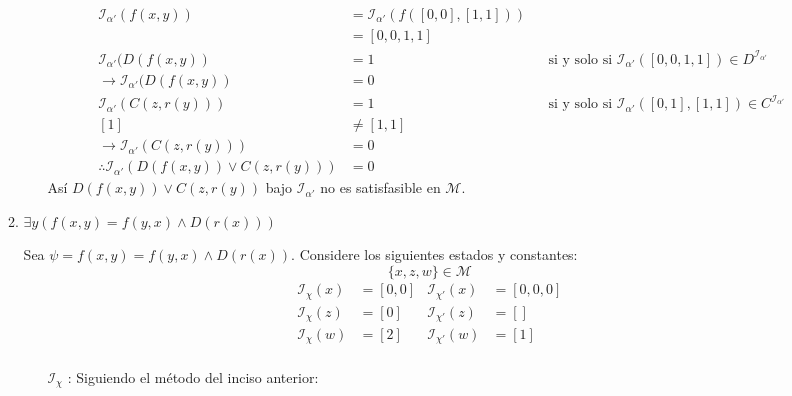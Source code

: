 \documentclass[8pt, letterpaper]{article}
\begin{document}
\begin{enumerate}
\begin{enumerate}
\begin{itemize}
\begin{align*}
        \mathcal{I}_{\alpha'}(f(x,y)) &= \mathcal{I}_{\alpha'}(f([0,0],[1, 1]))\\
        &= [0, 0, 1, 1]\\
        \mathcal{I}_{\alpha'}(D(f(x,y)) &= 1 & &\text{si y solo si }\mathcal{I}_{\alpha'}([0, 0, 1, 1])\in D^\mathcal{I_{\alpha'}}\\
        \rightarrow \mathcal{I}_{\alpha'}(D(f(x,y)) &= 0 \\
        \mathcal{I}_{\alpha'}(C(z, r(y))) &= 1 & &\text{si y solo si }\mathcal{I}_{\alpha'}([0,1],[1,1])\in C^\mathcal{I_{\alpha'}}\\
        [1] &\neq [1,1]\\
        \rightarrow \mathcal{I}_{\alpha'}(C(z, r(y))) &= 0\\
        \therefore \mathcal{I}_{\alpha'}(D(f(x,y)) \lor C(z, r(y))) &= 0
      \end{align*}
      Así $D(f(x,y)) \lor C(z, r(y))$ bajo $\mathcal{I}_{\alpha'}$ no es satisfasible en $\mathcal{M}$.
    \end{itemize}
  \item $\exists y(f(x,y) = f(y,x)\land D(r(x)))$

    \hfill\break
    Sea $\psi = f(x,y) = f(y,x)\land D(r(x))$. Considere los siguientes estados y constantes:
    $$\{x,z,w\}\in \mathcal{M}$$
    \begin{align*}
      \mathcal{I}_\chi(x) &= [0, 0] & \mathcal{I}_{\chi'}(x) &= [0,0,0]\\
      \mathcal{I}_\chi(z) &= [0] & \mathcal{I}_{\chi'}(z) &= []\\
      \mathcal{I}_\chi(w) &= [2] & \mathcal{I}_{\chi'}(w) &= [1]\\
    \end{align*}
        \begin{itemize}
    \item[$\mathcal{I}_\chi$]:
      Siguiendo el método del inciso anterior:
      

\end{itemize}
\end{enumerate}
\end{enumerate}
\end{document}
